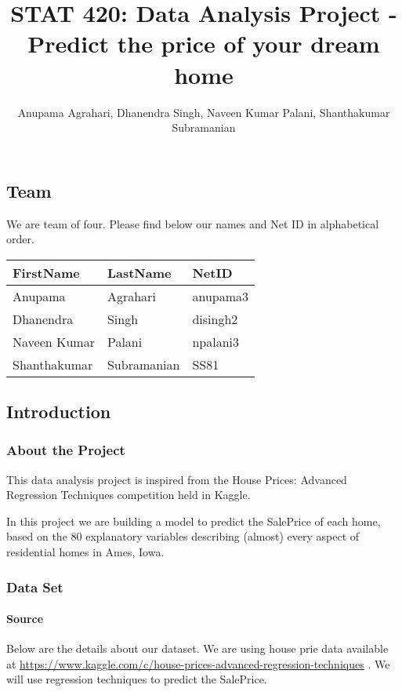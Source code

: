 \documentclass[]{article}
\title{STAT 420: Data Analysis Project - Predict the price of your dream home}
\author{Anupama Agrahari, Dhanendra Singh, Naveen Kumar Palani, Shanthakumar
Subramanian}
\date{}
\let\oldparagraph\paragraph
\renewcommand{\paragraph}[1]{\oldparagraph{#1}\mbox{}}
\begin{document}
\maketitle

\subsection{Team}\label{team}

We are team of four. Please find below our names and Net ID in
alphabetical order.

\begin{longtable}[]{@{}lll@{}}
\toprule
FirstName & LastName & NetID\tabularnewline
\midrule
\endhead
Anupama & Agrahari & anupama3\tabularnewline
Dhanendra & Singh & disingh2\tabularnewline
Naveen Kumar & Palani & npalani3\tabularnewline
Shanthakumar & Subramanian & SS81\tabularnewline
\bottomrule
\end{longtable}

\subsection{Introduction}\label{introduction}

\subsubsection{About the Project}\label{about-the-project}

This data analysis project is inspired from the House Prices: Advanced
Regression Techniques competition held in Kaggle.

In this project we are building a model to predict the SalePrice of each
home, based on the 80 explanatory variables describing (almost) every
aspect of residential homes in Ames, Iowa.

\subsubsection{Data Set}\label{data-set}

\paragraph{Source}\label{source}

Below are the details about our dataset. We are using house prie data
available at
\url{https://www.kaggle.com/c/house-prices-advanced-regression-techniques}
. We will use regression techniques to predict the SalePrice.
\end{document}
